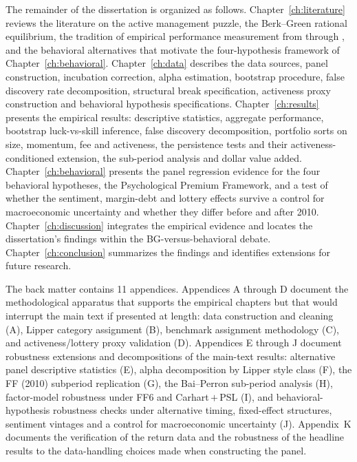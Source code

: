 \documentclass[12pt, oneside]{report}
\begin{document}
\noindent The remainder of the dissertation is organized as follows.
Chapter~\ref{ch:literature} reviews the literature on the active management puzzle, the Berk--Green rational equilibrium, the tradition of empirical performance measurement from \textcite{Jensen1968} through
\textcite{BarrasGagliardiniScaillet2022}, and the behavioral alternatives
that motivate the four-hypothesis framework of Chapter~\ref{ch:behavioral}.
Chapter~\ref{ch:data} describes the data sources, panel construction,
incubation correction, alpha estimation, bootstrap procedure, false
discovery rate decomposition, structural break specification, activeness
proxy construction and behavioral hypothesis specifications.
Chapter~\ref{ch:results} presents the empirical results:
descriptive statistics, aggregate performance, bootstrap luck-vs-skill
inference, false discovery decomposition, portfolio sorts on size, momentum, fee and activeness, the persistence tests and their activeness-conditioned extension, the sub-period analysis and dollar value added.
Chapter~\ref{ch:behavioral} presents the panel regression evidence for
the four behavioral hypotheses, the Psychological Premium
Framework, and a test of whether the sentiment, margin-debt and lottery
effects survive a control for macroeconomic uncertainty and whether they
differ before and after 2010. Chapter~\ref{ch:discussion} integrates the empirical evidence and locates the dissertation's findings within the BG-versus-behavioral debate. Chapter~\ref{ch:conclusion} summarizes the findings and identifies extensions for future research.

The back matter contains 11 appendices. Appendices A through D document the methodological apparatus that supports the empirical chapters but
that would interrupt the main text if presented at length:
data construction and cleaning (A), Lipper category assignment (B),
benchmark assignment methodology (C), and activeness/lottery proxy
validation (D). Appendices E through J document robustness extensions
and decompositions of the main-text results: alternative panel
descriptive statistics (E), alpha decomposition by Lipper style class (F),
the FF (2010) subperiod replication (G), the Bai--Perron sub-period
analysis (H), factor-model robustness under FF6 and Carhart\,$+$\,PSL (I),
and behavioral-hypothesis robustness checks under alternative timing,
fixed-effect structures, sentiment vintages and a control for
macroeconomic uncertainty (J). Appendix~K documents the verification of the return data and the robustness of the headline results to the
data-handling choices made when constructing the panel.
\end{document}
